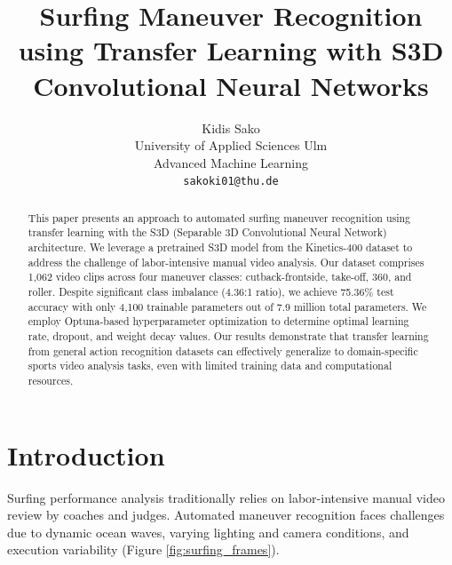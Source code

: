 \documentclass[11pt, journal]{IEEEtran}
\begin{document}
\title{Surfing Maneuver Recognition using Transfer Learning with S3D Convolutional Neural Networks}

\author{\parbox{3 in}{\centering Kidis Sako\\
         University of Applied Sciences Ulm\\
         Advanced Machine Learning\\
         {\tt\small sakoki01@thu.de}}
}


\maketitle

\begin{abstract}
This paper presents an approach to automated surfing maneuver recognition using transfer learning with the S3D (Separable 3D Convolutional Neural Network) architecture. We leverage a pretrained S3D model from the Kinetics-400 dataset to address the challenge of labor-intensive manual video analysis. Our dataset comprises 1,062 video clips across four maneuver classes: cutback-frontside, take-off, 360, and roller. Despite significant class imbalance (4.36:1 ratio), we achieve 75.36\% test accuracy with only 4,100 trainable parameters out of 7.9 million total parameters. We employ Optuna-based hyperparameter optimization to determine optimal learning rate, dropout, and weight decay values. Our results demonstrate that transfer learning from general action recognition datasets can effectively generalize to domain-specific sports video analysis tasks, even with limited training data and computational resources.
\end{abstract}

\IEEEpeerreviewmaketitle

\section{Introduction}
\label{sec:intro}

Surfing performance analysis traditionally relies on labor-intensive manual video review by coaches and judges. Automated maneuver recognition faces challenges due to dynamic ocean waves, varying lighting and camera conditions, and execution variability (Figure \ref{fig:surfing_frames}).
\end{document}
